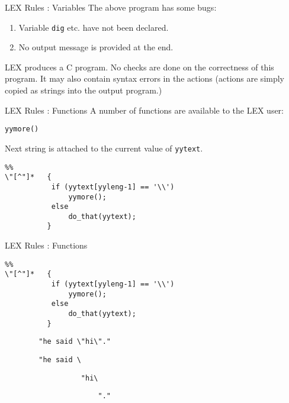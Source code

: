 \begin{frame}[fragile]{LEX Rules : Variables}
The above program has some bugs:


\vspace{20pt}

\begin{enumerate}
\item Variable {\tt dig} etc.
have not been declared.
\item No output message is provided at the end.
\end{enumerate}


\vspace{20pt}

LEX produces a C program. No checks are done on the
correctness of this program. It may also contain syntax errors
in the actions (actions are simply copied as strings into
the output program.)



\end{frame}
\begin{frame}[fragile]{LEX Rules : Functions}
A number of functions are available to the LEX user:


\vspace{20pt}

\begin{center}\tt yymore()\end{center}
Next string is attached to the current value of
{\tt yytext}.


\vspace{20pt}

\begin{verbatim}
%%
\"[^"]*   {
           if (yytext[yyleng-1] == '\\')
               yymore();
           else
               do_that(yytext);
          }
\end{verbatim}

\end{frame}
\begin{frame}[fragile]{LEX Rules : Functions}
\begin{verbatim}
%%
\"[^"]*   {
           if (yytext[yyleng-1] == '\\')
               yymore();
           else
               do_that(yytext);
          }
\end{verbatim}

\verb'        '\verb*'"he said \"hi\"."'

\verb'        '\verb*'"he said \'

\verb'        '\verb'          "hi\'

\verb'        '\verb'              "."'



\end{frame}
